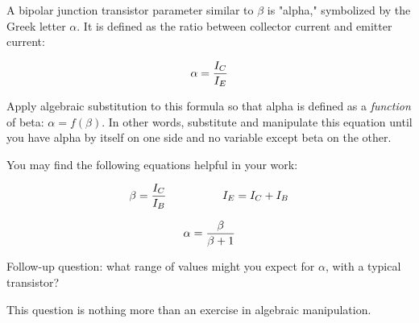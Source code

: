 

A bipolar junction transistor parameter similar to $\beta$ is "alpha," symbolized by the Greek letter $\alpha$.  It is defined as the ratio between collector current and emitter current:

$$\alpha = {I_C \over I_E}$$

Apply algebraic substitution to this formula so that alpha is defined as a {\it function} of beta: $\alpha = f(\beta)$.  In other words, substitute and manipulate this equation until you have alpha by itself on one side and no variable except beta on the other.

You may find the following equations helpful in your work:

$$\beta = {I_C \over I_B} \hbox{\hskip 50pt} I_E = I_C + I_B$$







$$\alpha = {\beta \over {\beta + 1}}$$

\vskip 10pt

Follow-up question: what range of values might you expect for $\alpha$, with a typical transistor?







This question is nothing more than an exercise in algebraic manipulation.




